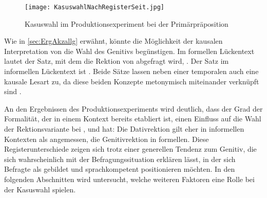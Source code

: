 \begin{figure}
\texttt{[image: KasuswahlNachRegisterSeit.jpg]}
\caption{Kasuswahl im Produktionsexperiment bei der Primärpräposition }
\label{pic:KasuswahlSeit}
\end{figure}

Wie in \autoref{sec:ErgAkzallg} erwähnt, könnte die Möglichkeit der kausalen Interpretation von  die Wahl des Genitivs begünstigen. 
Im formellen Lückentext lautet der Satz, mit dem die Rektion von  abgefragt wird, .
Der Satz im informellen Lückentext ist .
Beide Sätze lassen neben einer temporalen auch eine kausale Lesart zu, da diese beiden Konzepte metonymisch miteinander verknüpft sind \citep[s.][]{Traugott.1991}. 

An den Ergebnissen des Produktionsexperiments wird deutlich, dass der Grad der Formalität, der in einem Kontext bereits etabliert ist, einen Einfluss auf die Wahl der Rektionsvariante bei \wegen{}, \waehrend{} und \dank{} hat: 
Die Dativrektion gilt eher in informellen Kontexten als angemessen, die Genitivrektion in formellen. 
Diese Registerunterschiede zeigen sich trotz einer generellen 
Tendenz zum Genitiv, die sich wahrscheinlich mit der Befragungssituation erklären lässt, in der sich Befragte als gebildet und sprachkompetent positionieren möchten.
In den folgenden Abschnitten wird untersucht, welche weiteren Faktoren eine Rolle bei der Kasuswahl spielen. 
